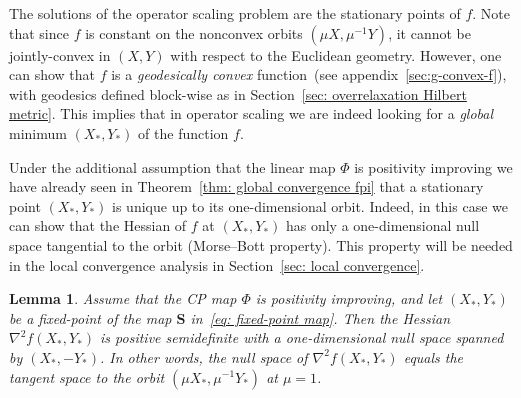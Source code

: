 \documentclass[a4paper]{article}
\newcommand{\bS}{\mathbf{S}}
\newtheorem{lemma}[theorem]{Lemma}
\theoremstyle{definition}
\numberwithin{equation}{section}
\begin{document}
The solutions of the operator scaling problem are the stationary points of $f$. Note that since $f$ is constant on the nonconvex orbits $(\mu X, \mu^{-1} Y)$, it cannot be jointly-convex in  $(X,Y)$ with respect to the Euclidean geometry. However, one can show that $f$ is a \emph{geodesically convex} function~(see appendix~\ref{sec:g-convex-f}), with geodesics defined block-wise as in Section~\ref{sec: overrelaxation Hilbert metric}. This implies that in operator scaling we are indeed looking for a \emph{global} minimum $(X_*,Y_*)$ of the function $f$.

Under the additional assumption that the linear map $\Phi$ is positivity improving we have already seen in Theorem~\ref{thm: global convergence fpi} that a stationary point $(X_*,Y_*)$ is unique up to its one-dimensional orbit. Indeed, in this case we can show that the Hessian of $f$ at $(X_*,Y_*)$ has only a one-dimensional null space tangential to the orbit (Morse--Bott property). This property will be needed in the local convergence analysis in Section~\ref{sec: local convergence}. 

\begin{lemma}\label{lem: null space of Hessian}
Assume that the CP map $\Phi$ is positivity improving, and let $(X_*,Y_*)$ be a fixed-point of the map $\bS$ in~\eqref{eq: fixed-point map}. Then the Hessian $\nabla^2 f(X_*,Y_*)$ is positive semidefinite with a one-dimensional null space spanned by $(X_*,-Y_*)$. In other words, the null space of $\nabla^2 f(X_*,Y_*)$ equals the tangent space to the orbit $(\mu X_*,\mu^{-1} Y_*)$ at $\mu = 1$.
\end{lemma}
\end{document}
